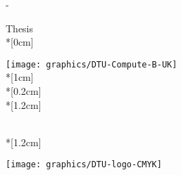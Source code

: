 \thispagestyle{empty}             %
\calccentering{\unitlength}
\begin{adjustwidth*}{\unitlength}{-\unitlength}
    \begin{adjustwidth}{-0.5cm}{-0.5cm}
        \sffamily
        \begin{flushright}
            \thesistypeabbr{} Thesis\\*[0cm]
            \thesistype{}\\
        \end{flushright}
        \vspace*{\fill}
        \noindent
        \texttt{[image: graphics/DTU-Compute-B-UK]}\\*[1cm]
        \HUGE \thesistitle{}\\*[0.2cm]
        \Huge \thesissubtitle{}\\*[1.2cm]
        \parbox[b]{0.5\linewidth}{%
            \large \thesisauthor{}\\*[1.2cm]
            \small \thesislocation{} \thesisyear{}\\
            \small \thesisnumber{}
        }
        \hfill\texttt{[image: graphics/DTU-logo-CMYK]}
    \end{adjustwidth}
\end{adjustwidth*}
\normalfont
\normalsize
